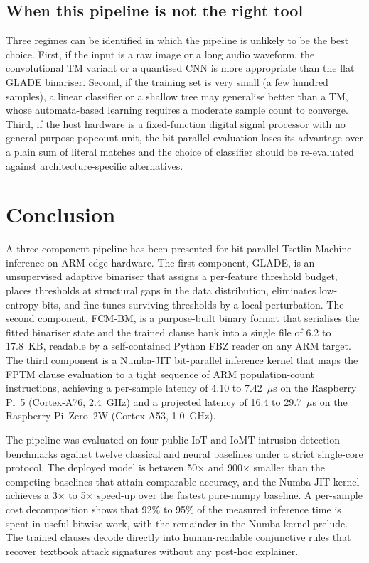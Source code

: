 \documentclass[journal,10pt]{IEEEtran}
\begin{document}
\subsection{When this pipeline is not the right tool}
\label{sec:disc-limits2}
Three regimes can be identified in which the pipeline is unlikely to
be the best choice. First, if the input is a raw image or a long
audio waveform, the convolutional TM variant or a quantised CNN is
more appropriate than the flat GLADE binariser. Second, if the
training set is very small (a few hundred samples), a linear
classifier or a shallow tree may generalise better than a TM, whose
automata-based learning requires a moderate sample count to converge.
Third, if the host hardware is a fixed-function digital signal
processor with no general-purpose popcount unit, the bit-parallel
evaluation loses its advantage over a plain sum of literal matches
and the choice of classifier should be re-evaluated against
architecture-specific alternatives.

\section{Conclusion}
\label{sec:conclusion}

A three-component pipeline has been presented for bit-parallel
Tsetlin Machine inference on ARM edge hardware. The first component,
GLADE, is an unsupervised adaptive binariser that assigns a
per-feature threshold budget, places thresholds at structural gaps in
the data distribution, eliminates low-entropy bits, and fine-tunes
surviving thresholds by a local perturbation. The second component,
FCM-BM, is a purpose-built binary format that serialises the fitted
binariser state and the trained clause bank into a single file of
6.2 to 17.8~KB, readable by a self-contained Python FBZ reader on any ARM
target. The third component is a Numba-JIT bit-parallel inference kernel that
maps the FPTM clause evaluation to a tight sequence of ARM
population-count instructions, achieving a per-sample latency of 4.10
to 7.42~$\mu$s on the Raspberry Pi~5 (Cortex-A76, 2.4~GHz) and a
projected latency of 16.4 to 29.7~$\mu$s on the Raspberry Pi~Zero~2W
(Cortex-A53, 1.0~GHz).

The pipeline was evaluated on four public IoT and IoMT
intrusion-detection benchmarks against twelve classical and neural
baselines under a strict single-core protocol. The deployed model is
between 50$\times$ and 900$\times$ smaller than the competing baselines
that attain comparable accuracy, and the Numba JIT kernel achieves a
3$\times$ to 5$\times$ speed-up over the fastest pure-numpy
baseline. A per-sample cost decomposition shows that 92\% to 95\% of
the measured inference time is spent in useful bitwise work, with the
remainder in the Numba kernel prelude. The trained clauses decode
directly into human-readable conjunctive rules that recover textbook
attack signatures without any post-hoc explainer.
\end{document}
